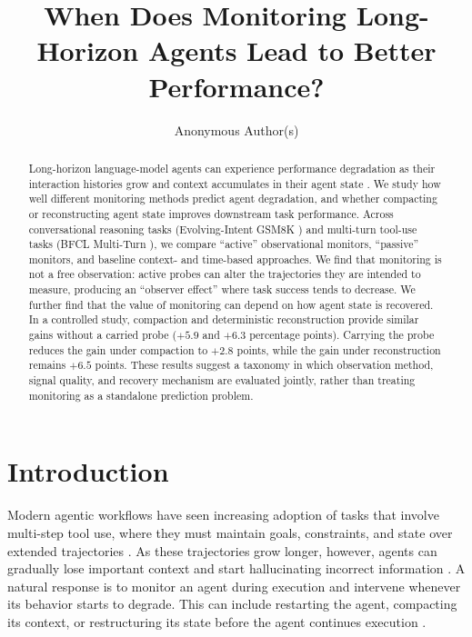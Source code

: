 \documentclass{article}
\title{When Does Monitoring Long-Horizon Agents Lead to Better Performance?}
\author{Anonymous Author(s)}
\begin{document}
\maketitle

\begin{abstract}
Long-horizon language-model agents can experience performance degradation as their interaction histories grow and context accumulates in their agent state \citep{liu2024lost}. We study how well different monitoring methods predict agent degradation, and whether compacting or reconstructing agent state improves downstream task performance. Across conversational reasoning tasks (Evolving-Intent GSM8K \citep{laban2025lost}) and multi-turn tool-use tasks (BFCL Multi-Turn \citep{patil2025bfcl}), we compare ``active'' observational monitors, ``passive'' monitors, and baseline context- and time-based approaches. We find that monitoring is not a free observation: active probes can alter the trajectories they are intended to measure, producing an ``observer effect'' where task success tends to decrease. We further find that the value of monitoring can depend on how agent state is recovered. In a controlled study, compaction and deterministic reconstruction provide similar gains without a carried probe ($+5.9$ and $+6.3$ percentage points). Carrying the probe reduces the gain under compaction to $+2.8$ points, while the gain under reconstruction remains $+6.5$ points. These results suggest a taxonomy in which observation method, signal quality, and recovery mechanism are evaluated jointly, rather than treating monitoring as a standalone prediction problem.
\end{abstract}

\section{Introduction}

Modern agentic workflows have seen increasing adoption of tasks that involve multi-step tool use, where they must maintain goals, constraints, and state over extended trajectories \citep{zheng2025deepresearcher,jimenez2024swebench}. As these trajectories grow longer, however, agents can gradually lose important context and start hallucinating incorrect information \citep{laban2025lost}. A natural response is to monitor an agent during execution and intervene whenever its behavior starts to degrade. This can include restarting the agent, compacting its context, or restructuring its state before the agent continues execution \citep{wang2026failfast,semenov2026compaction,zhuang2026agentrewind}.
\end{document}
